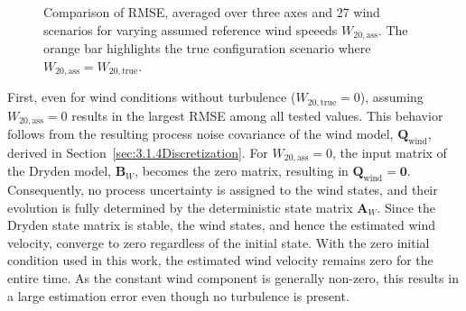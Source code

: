 \begin{figure}[htb]
	\vspace{1em}
	
	\begin{subfigure}[t]{0.48\linewidth}
		\centering
	\end{subfigure}
	\hfill
	\begin{subfigure}[t]{0.48\linewidth}
		\centering
	\end{subfigure}
	
	\caption{Comparison of RMSE, averaged over three axes and 27 wind scenarios for varying assumed reference wind speeeds $W_{20, \mathrm{ass}}$. The orange bar highlights the true configuration scenario where $W_{20, \mathrm{ass}} = W_{20, \mathrm{true}}$.}
	\label{fig:W20_Barchart}
\end{figure}

First, even for wind conditions without turbulence ($W_{20,\mathrm{true}}=0$), assuming $W_{20,\mathrm{ass}}=0$ results in the largest RMSE among all tested values. 
This behavior follows from the resulting process noise covariance of the wind model, $\bm{Q}_{\mathrm{wind}}$, derived in Section~\ref{sec:3.1.4Discretization}. For $W_{20,\mathrm{ass}}=0$, the input matrix of the Dryden model, $\bm{B}_W$, becomes the zero matrix, resulting in $\bm{Q}_{\mathrm{wind}}=\bm{0}$. Consequently, no process uncertainty is assigned to the wind states, and their evolution is fully determined by the deterministic state matrix $\bm{A}_W$. Since the Dryden state matrix is stable, the wind states, and hence the estimated wind velocity, converge to zero regardless of the initial state. With the zero initial condition used in this work, the estimated wind velocity remains zero for the entire time. As the constant wind component is generally non-zero, this results in a large estimation error even though no turbulence is present.

